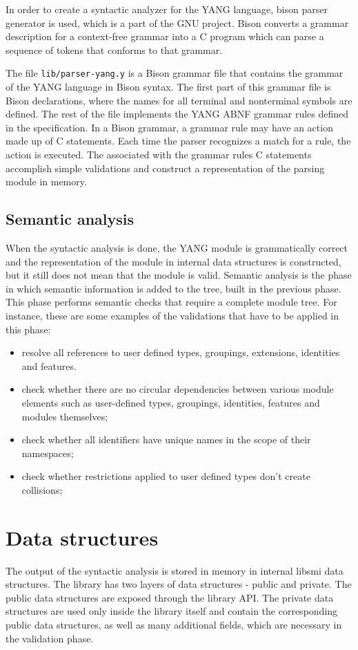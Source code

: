 \documentclass[conference]{IEEEtran}
\begin{document}
In order to create a syntactic analyzer for the YANG language, bison parser generator \cite{bib6} is used, which is a part of the GNU project.
Bison converts a grammar description for a context-free grammar into a C program which can parse a sequence of tokens that conforms to that grammar. 

The file \texttt{lib/parser-yang.y} is a Bison grammar file that contains the grammar of the YANG language in Bison syntax. 
The first part of this grammar file is Bison declarations, where the names for all terminal and nonterminal symbols are defined. 
The rest of the file implements the YANG ABNF grammar rules defined in the specification. 
In a Bison grammar, a grammar rule may have an action made up of C statements. 
Each time the parser recognizes a match for a rule, the action is executed. 
The associated with the grammar rules C statements accomplish simple validations and construct a representation of the parsing module in memory.

\subsection{Semantic analysis}
When the syntactic analysis is done, the YANG module is grammatically correct and the representation of the module in internal data structures is constructed,
but it still does not mean that the  module is valid. Semantic analysis is the phase in which semantic information is added to the tree, built in the previous phase.
This phase performs semantic checks that require a complete module tree. For instance, these are some examples of the validations that have to be applied in this phase:
\begin{itemize}
\item resolve all references to user defined types, groupings, extensions, identities and features.
\item check whether there are no circular dependencies between various module elements such as user-defined types, groupings, identities, features and modules themselves;
\item check whether all identifiers have unique names in the scope of their namespaces;
\item check whether restrictions applied to user defined types don't create collisions;
\end{itemize}

\section{Data structures}
The output of the syntactic analysis is stored in memory in internal libsmi data structures. 
The library has two layers of data structures - public and private. 
The public data structures are exposed through the library API. 
The private data structures are used only inside the library itself and contain the corresponding public data structures, 
as well as many additional fields, which are necessary in the validation phase. 
\end{document}
